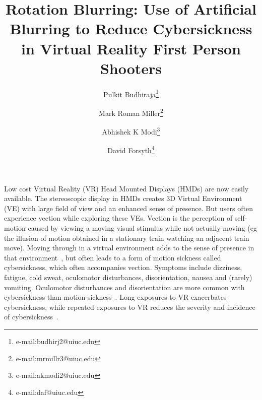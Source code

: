 \documentclass{vgtc}                          %
\title{Rotation Blurring: Use of Artificial Blurring to Reduce Cybersickness in Virtual Reality First Person Shooters}
\author{Pulkit Budhiraja\thanks{e-mail:budhirj2@uiuc.edu} %
\and Mark Roman Miller\thanks{e-mail:mrmillr3@uiuc.edu} %
\and Abhishek K Modi\thanks{e-mail:akmodi2@uiuc.edu} %
\and David Forsyth\thanks{e-mail:daf@uiuc.edu} %
\affiliation{\scriptsize University of Illinois at Urbana-Champaign, Urbana, Illinois, United States}}
\begin{document}


\maketitle


Low cost Virtual Reality (VR) Head Mounted Displays (HMDs) are now easily available.
The stereoscopic display in HMDs creates 3D Virtual Environment (VE) with large field of view and an enhanced sense of presence. But users often experience vection while exploring these VEs. Vection is the perception of self-motion caused by viewing a moving visual stimulus while not actually moving (eg the illusion of motion obtained in a stationary train watching an adjacent train move). 
Moving through in a virtual environment adds to the sense of presence in that environment~\cite{riecke2010compelling}, but often leads to a form of motion sickness called cybersickness, which often accompanies vection. Symptoms include dizziness,  fatigue, cold sweat, oculomotor disturbances, disorientation, nausea and (rarely) vomiting. Oculomotor disturbances and disorientation are more common with cybersickness than motion sickness~\cite{lawson2014handbook1}. Long exposures to VR exacerbates cybersickness, while repeated exposures to VR reduces the severity and incidence of cybersickness~\cite{kennedy2000duration}.

\end{document}
